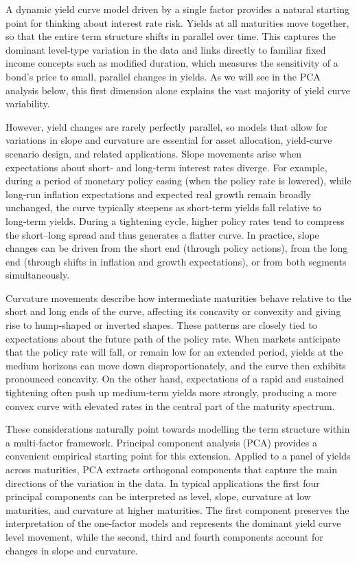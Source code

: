\documentclass[
  letterpaper,
  DIV=11,
  numbers=noendperiod]{scrreprt}
\begin{document}
A dynamic yield curve model driven by a single factor provides a natural
starting point for thinking about interest rate risk. Yields at all
maturities move together, so that the entire term structure shifts in
parallel over time. This captures the dominant level‑type variation in
the data and links directly to familiar fixed income concepts such as
modified duration, which measures the sensitivity of a bond's price to
small, parallel changes in yields. As we will see in the PCA analysis
below, this first dimension alone explains the vast majority of yield
curve variability.

However, yield changes are rarely perfectly parallel, so models that
allow for variations in slope and curvature are essential for asset
allocation, yield‑curve scenario design, and related applications. Slope
movements arise when expectations about short‑ and long‑term interest
rates diverge. For example, during a period of monetary policy easing
(when the policy rate is lowered), while long‑run inflation expectations
and expected real growth remain broadly unchanged, the curve typically
steepens as short‑term yields fall relative to long‑term yields. During
a tightening cycle, higher policy rates tend to compress the short--long
spread and thus generates a flatter curve. In practice, slope changes
can be driven from the short end (through policy actions), from the long
end (through shifts in inflation and growth expectations), or from both
segments simultaneously.

Curvature movements describe how intermediate maturities behave relative
to the short and long ends of the curve, affecting its concavity or
convexity and giving rise to hump‑shaped or inverted shapes. These
patterns are closely tied to expectations about the future path of the
policy rate. When markets anticipate that the policy rate will fall, or
remain low for an extended period, yields at the medium horizons can
move down disproportionately, and the curve then exhibits pronounced
concavity. On the other hand, expectations of a rapid and sustained
tightening often push up medium‑term yields more strongly, producing a
more convex curve with elevated rates in the central part of the
maturity spectrum.

These considerations naturally point towards modelling the term
structure within a multi‑factor framework. Principal component analysis
(PCA) provides a convenient empirical starting point for this extension.
Applied to a panel of yields across maturities, PCA extracts orthogonal
components that capture the main directions of the variation in the
data. In typical applications the first four principal components can be
interpreted as level, slope, curvature at low maturities, and curvature
at higher maturities. The first component preserves the interpretation
of the one‑factor models and represents the dominant yield curve level
movement, while the second, third and fourth components account for
changes in slope and curvature.
\end{document}
